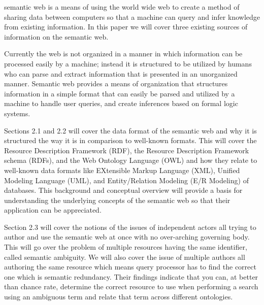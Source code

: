 \documentclass[10pt,journal,compsoc]{IEEEtran}
\begin{document}

 semantic web is a means of using the world wide web to create a method of sharing data between computers so that a machine can query and infer knowledge from existing information. In this paper we will cover three existing sources of information on the semantic web. 

Currently the web is not organized in a manner in which information can be processed easily by a machine; instead it is structured to be utilized by humans who can parse and extract information that is presented in an unorganized manner. Semantic web provides a means of organization that structures information in a simple format that can easily be parsed and utilized by a machine to handle user queries, and create inferences based on formal logic systems.

Sections 2.1 and 2.2 will cover the data format of the semantic web and why it is structured the way it is in comparison to well-known formats. This will cover the Resource Description Framework (RDF), the Resource Description Framework schema (RDFs), and the Web Ontology Language (OWL) and how they relate to well-known data formats like EXtensible Markup Language (XML), Unified Modeling Language (UML), and Entity/Relation Modeling (E/R Modeling) of databases. This background and conceptual overview will provide a basis for understanding the underlying concepts of the semantic web so that their application can be appreciated.

Section 2.3 will cover the notions of the issues of independent actors all trying to author and use the semantic web at once with no over-arching governing body. This will go over the problem of multiple resources having the same identifier, called semantic ambiguity. We will also cover the issue of multiple authors all authoring the same resource which means query processor has to find the correct one which is semantic redundancy. Their findings indicate that you can, at better than chance rate, determine the correct resource to use when performing a search using an ambiguous term and relate that term across different ontologies.
\end{document}
